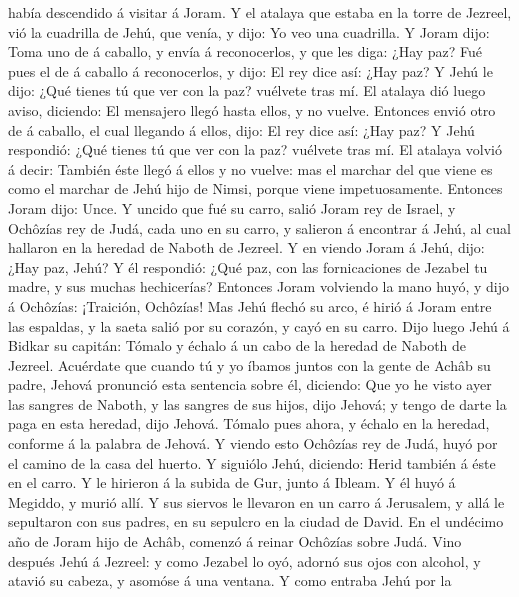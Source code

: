 había descendido á visitar á Joram.  Y el atalaya que
estaba en la torre de Jezreel, vió la cuadrilla de Jehú, que venía, y
dijo: Yo veo una cuadrilla. Y Joram dijo: Toma uno de á caballo, y envía
á reconocerlos, y que les diga: ¿Hay paz?  Fué pues el de
á caballo á reconocerlos, y dijo: El rey dice así: ¿Hay paz? Y Jehú le
dijo: ¿Qué tienes tú que ver con la paz? vuélvete tras mí. El atalaya
dió luego aviso, diciendo: El mensajero llegó hasta ellos, y no vuelve.
 Entonces envió otro de á caballo, el cual llegando á
ellos, dijo: El rey dice así: ¿Hay paz? Y Jehú respondió: ¿Qué tienes tú
que ver con la paz? vuélvete tras mí.  El atalaya volvió
á decir: También éste llegó á ellos y no vuelve: mas el marchar del que
viene es como el marchar de Jehú hijo de Nimsi, porque viene
impetuosamente.  Entonces Joram dijo: Unce. Y uncido que
fué su carro, salió Joram rey de Israel, y Ochôzías rey de Judá, cada
uno en su carro, y salieron á encontrar á Jehú, al cual hallaron en la
heredad de Naboth de Jezreel.  Y en viendo Joram á Jehú,
dijo: ¿Hay paz, Jehú? Y él respondió: ¿Qué paz, con las fornicaciones de
Jezabel tu madre, y sus muchas hechicerías?  Entonces
Joram volviendo la mano huyó, y dijo á Ochôzías: ¡Traición, Ochôzías!
 Mas Jehú flechó su arco, é hirió á Joram entre las
espaldas, y la saeta salió por su corazón, y cayó en su carro.
 Dijo luego Jehú á Bidkar su capitán: Tómalo y échalo á
un cabo de la heredad de Naboth de Jezreel. Acuérdate que cuando tú y yo
íbamos juntos con la gente de Achâb su padre, Jehová pronunció esta
sentencia sobre él, diciendo:  Que yo he visto ayer las
sangres de Naboth, y las sangres de sus hijos, dijo Jehová; y tengo de
darte la paga en esta heredad, dijo Jehová. Tómalo pues ahora, y échalo
en la heredad, conforme á la palabra de Jehová.  Y viendo
esto Ochôzías rey de Judá, huyó por el camino de la casa del huerto. Y
siguiólo Jehú, diciendo: Herid también á éste en el carro. Y le hirieron
á la subida de Gur, junto á Ibleam. Y él huyó á Megiddo, y murió allí.
 Y sus siervos le llevaron en un carro á Jerusalem, y
allá le sepultaron con sus padres, en su sepulcro en la ciudad de David.
 En el undécimo año de Joram hijo de Achâb, comenzó á
reinar Ochôzías sobre Judá.  Vino después Jehú á Jezreel:
y como Jezabel lo oyó, adornó sus ojos con alcohol, y atavió su cabeza,
y asomóse á una ventana.  Y como entraba Jehú por la
